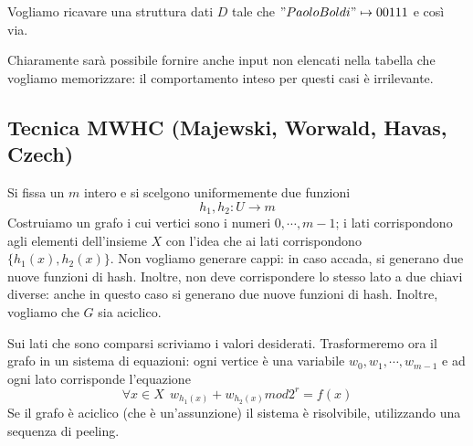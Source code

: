 Vogliamo ricavare una struttura dati $D$ tale che $"Paolo Boldi" \mapsto 00111$ e così via.


Chiaramente sarà possibile fornire anche input non elencati nella tabella che vogliamo memorizzare:
il comportamento inteso per questi casi è irrilevante.
\subsection{Tecnica MWHC (Majewski, Worwald, Havas, Czech)}
Si fissa un $m$ intero e si scelgono uniformemente due funzioni
$$
	h_1, h_2 : U \rightarrow m
$$
Costruiamo un grafo i cui vertici sono i numeri $0, \cdots, m-1$; i lati corrispondono agli elementi 
dell'insieme $X$ con l'idea che ai lati corrispondono $\{h_1(x), h_2(x)\}$. Non vogliamo generare 
cappi: in caso accada, si generano due nuove funzioni di hash. Inoltre, non deve corrispondere lo 
stesso lato a due chiavi diverse: anche in questo caso si generano due nuove funzioni di hash. 
Inoltre, vogliamo che $G$ sia aciclico. 

Sui lati che sono comparsi scriviamo i valori desiderati. Trasformeremo ora il grafo in un sistema di 
equazioni: ogni vertice è una variabile $w_0, w_1, \cdots, w_{m-1}$ e ad ogni lato corrisponde 
l'equazione 
$$
    \forall x \in X ~~ w_{h_1(x)} + w_{h_2(x)} mod 2^r = f(x)
$$
Se il grafo è aciclico (che è un'assunzione) il sistema è risolvibile, utilizzando una sequenza di 
peeling. 
